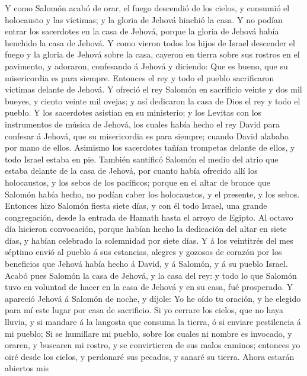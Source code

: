  Y como Salomón acabó de orar, el fuego descendió de los
cielos, y consumió el holocausto y las víctimas; y la gloria de Jehová
hinchió la casa.  Y no podían entrar los sacerdotes en la
casa de Jehová, porque la gloria de Jehová había henchido la casa de
Jehová.  Y como vieron todos los hijos de Israel descender
el fuego y la gloria de Jehová sobre la casa, cayeron en tierra sobre
sus rostros en el pavimento, y adoraron, confesando á Jehová y diciendo:
Que es bueno, que su misericordia es para siempre.  Entonces
el rey y todo el pueblo sacrificaron víctimas delante de Jehová.
 Y ofreció el rey Salomón en sacrificio veinte y dos mil
bueyes, y ciento veinte mil ovejas; y así dedicaron la casa de Dios el
rey y todo el pueblo.  Y los sacerdotes asistían en su
ministerio; y los Levitas con los instrumentos de música de Jehová, los
cuales había hecho el rey David para confesar á Jehová, que su
misericordia es para siempre; cuando David alababa por mano de ellos.
Asimismo los sacerdotes tañían trompetas delante de ellos, y todo Israel
estaba en pie.  También santificó Salomón el medio del atrio
que estaba delante de la casa de Jehová, por cuanto había ofrecido allí
los holocaustos, y los sebos de los pacíficos; porque en el altar de
bronce que Salomón había hecho, no podían caber los holocaustos, y el
presente, y los sebos.  Entonces hizo Salomón fiesta siete
días, y con él todo Israel, una grande congregación, desde la entrada de
Hamath hasta el arroyo de Egipto.  Al octavo día hicieron
convocación, porque habían hecho la dedicación del altar en siete días,
y habían celebrado la solemnidad por siete días.  Y á los
veintitrés del mes séptimo envió al pueblo á sus estancias, alegres y
gozosos de corazón por los beneficios que Jehová había hecho á David, y
á Salomón, y á su pueblo Israel.  Acabó pues Salomón la
casa de Jehová, y la casa del rey: y todo lo que Salomón tuvo en
voluntad de hacer en la casa de Jehová y en su casa, fué prosperado.
 Y apareció Jehová á Salomón de noche, y díjole: Yo he oído
tu oración, y he elegido para mí este lugar por casa de sacrificio.
 Si yo cerrare los cielos, que no haya lluvia, y si mandare
á la langosta que consuma la tierra, ó si enviare pestilencia á mi
pueblo;  Si se humillare mi pueblo, sobre los cuales ni
nombre es invocado, y oraren, y buscaren mi rostro, y se convirtieren de
sus malos caminos; entonces yo oiré desde los cielos, y perdonaré sus
pecados, y sanaré su tierra.  Ahora estarán abiertos mis
